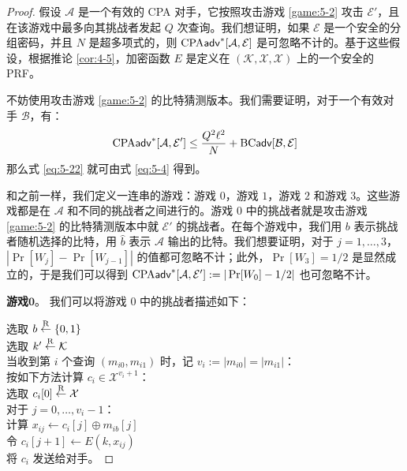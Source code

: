 \begin{proof}
假设 $\mathcal{A}$ 是一个有效的 CPA 对手，它按照攻击游戏 \ref{game:5-2} 攻击 $\mathcal{E}'$，且在该游戏中最多向其挑战者发起 $Q$ 次查询。我们想证明，如果 $\mathcal{E}$ 是一个安全的分组密码，并且 $N$ 是超多项式的，则 ${\rm CPA}\mathsf{adv}^*[\mathcal{A},\mathcal{E}]$ 是可忽略不计的。基于这些假设，根据推论 \ref{cor:4-5}，加密函数 $E$ 是定义在 $(\mathcal{K},\mathcal{X},\mathcal{X})$ 上的一个安全的 PRF。

不妨使用攻击游戏 \ref{game:5-2} 的比特猜测版本。我们需要证明，对于一个有效对手 $\mathcal{B}$，有：
\begin{equation}\label{eq:5-23}
{\rm CPA}\mathsf{adv}^*[\mathcal{A}, \mathcal{E}']\leq\frac{Q^2\ell^2}{N}+{\rm BC\mathsf{adv}}[\mathcal{B},\mathcal{E}]
\end{equation}
那么式 \ref{eq:5-22} 就可由式 \ref{eq:5-4} 得到。

和之前一样，我们定义一连串的游戏：游戏 $0$，游戏 $1$，游戏 $2$ 和游戏 $3$。这些游戏都是在 $\mathcal{A}$ 和不同的挑战者之间进行的。游戏 $0$ 中的挑战者就是攻击游戏 \ref{game:5-2} 的比特猜测版本中就 $\mathcal{E}'$ 的挑战者。在每个游戏中，我们用 $b$ 表示挑战者随机选择的比特，用 $\hat b$ 表示 $\mathcal{A}$ 输出的比特。我们想要证明，对于 $j = 1,\dots,3$，$|\Pr[W_j]-\Pr[W_{j-1}]|$ 的值都可忽略不计；此外，$\Pr[W_3]={1}/{2}$ 是显然成立的，于是我们可以得到 ${\rm CPA}\mathsf{adv}^*[\mathcal{A}, \mathcal{E}']:=|\Pr[W_0]-{1}/{2}|$ 也可忽略不计。

\vspace{5pt}

\noindent\textbf{游戏$\mathbf{0}$}。
我们可以将游戏 $0$ 中的挑战者描述如下：

\vspace{5pt}

\hspace*{5pt} 选取 $b\overset{\rm R}\leftarrow\{0,1\}$\\
\hspace*{26pt} 选取 $k'\overset{\rm R}\leftarrow\mathcal{K}$\\
\hspace*{26pt} 当收到第 $i$ 个查询 $(m_{i0},m_{i1})$ 时，记 $v_i:=|m_{i0}|=|m_{i1}|$：\\
\hspace*{50pt} 按如下方法计算 $c_i\in\mathcal{X}^{v_i+1}$：\\
\hspace*{75pt} 选取 $c_i[0]\overset{\rm R}\leftarrow\mathcal{X}$\\
\hspace*{75pt} 对于 $j=0,\dots,v_i-1$：\\
\hspace*{100pt} 计算 $x_{ij}\leftarrow c_i[j]\oplus m_{ib}[j]$\\
\hspace*{100pt} 令 $c_i[j+1]\leftarrow E(k,x_{ij})$\\
\hspace*{50pt} 将 $c_i$ 发送给对手。


\end{proof}
